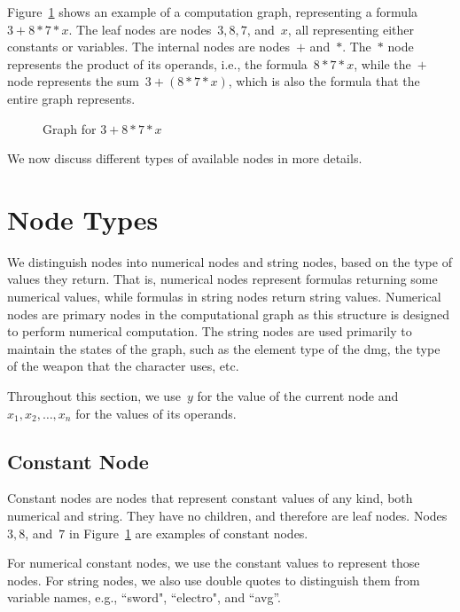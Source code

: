 \documentclass{article}
\begin{document}
Figure~\ref{fig:design:graph-example} shows an example of a computation graph, representing a formula~$3 + 8 * 7 * x$.
The leaf nodes are nodes~$3, 8, 7$, and~$x$, all representing either constants or variables.
The internal nodes are nodes~$+$ and~$*$.
The~$*$ node represents the product of its operands, i.e., the formula~$8 * 7 * x$, while the~$+$ node represents the sum~$3 + (8 * 7 * x)$, which is also the formula that the entire graph represents.
%
\begin{figure}
	\centering
	\caption{Graph for $3 + 8 * 7 * x$}
	\label{fig:design:graph-example}
\end{figure}

We now discuss different types of available nodes in more details.

\section{Node Types}

We distinguish nodes into numerical nodes and string nodes, based on the type of values they return.
That is, numerical nodes represent formulas returning some numerical values, while formulas in string nodes return string values.
Numerical nodes are primary nodes in the computational graph as this structure is designed to perform numerical computation.
The string nodes are used primarily to maintain the states of the graph, such as the element type of the dmg, the type of the weapon that the character uses, etc.

Throughout this section, we use~$y$ for the value of the current node and~$x_1, x_2, \dots, x_n$ for the values of its operands.

\subsection{Constant Node}

Constant nodes are nodes that represent constant values of any kind, both numerical and string.
They have no children, and therefore are leaf nodes.
Nodes~$3, 8$, and~$7$ in Figure~\ref{fig:design:graph-example} are examples of constant nodes.

For numerical constant nodes, we use the constant values to represent those nodes.
For string nodes, we also use double quotes to distinguish them from variable names, e.g., ``sword", ``electro", and ``avg''.
\end{document}

